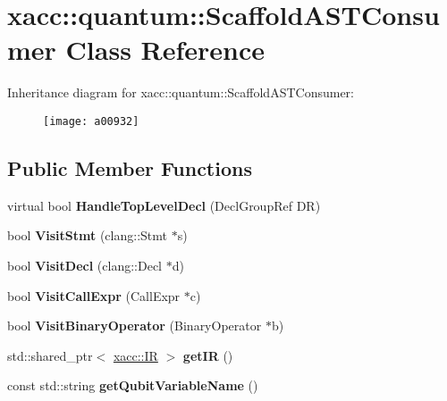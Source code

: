 \hypertarget{a00932}{}\section{xacc\+:\+:quantum\+:\+:Scaffold\+A\+S\+T\+Consumer Class Reference}
\label{a00932}
Inheritance diagram for xacc\+:\+:quantum\+:\+:Scaffold\+A\+S\+T\+Consumer\+:\begin{figure}[H]
\begin{center}
\leavevmode
\texttt{[image: a00932]}
\end{center}
\end{figure}
\subsection*{Public Member Functions}
\begin{DoxyCompactItemize}
\item 
\mbox{\label{a00932_ae846fd40684f3a1f820b8711e1204089}} 
virtual bool {\bfseries Handle\+Top\+Level\+Decl} (Decl\+Group\+Ref DR)
\item 
\mbox{\label{a00932_a6693c27f68332d8142fbdcb405e3259b}} 
bool {\bfseries Visit\+Stmt} (clang\+::\+Stmt $\ast$s)
\item 
\mbox{\label{a00932_ae6a05fe567cd8ea15feb694dbb898c33}} 
bool {\bfseries Visit\+Decl} (clang\+::\+Decl $\ast$d)
\item 
\mbox{\label{a00932_a1478fc9e887b04d2ad2aa8347ef6bbcb}} 
bool {\bfseries Visit\+Call\+Expr} (Call\+Expr $\ast$c)
\item 
\mbox{\label{a00932_a3f2f070888678caf53e57041b4f5ddd6}} 
bool {\bfseries Visit\+Binary\+Operator} (Binary\+Operator $\ast$b)
\item 
\mbox{\label{a00932_af9dbfa7c52b8a7de99132257e154e29a}} 
std\+::shared\+\_\+ptr$<$ \hyperlink{a01148}{xacc\+::\+IR} $>$ {\bfseries get\+IR} ()
\item 
\mbox{\label{a00932_aa301f0bcae6fb5a1c17557ba08144cb4}} 
const std\+::string {\bfseries get\+Qubit\+Variable\+Name} ()
\end{DoxyCompactItemize}
